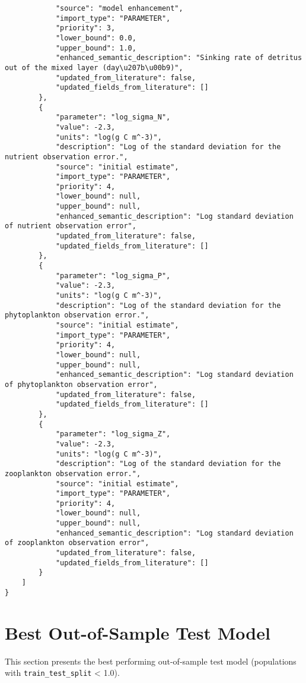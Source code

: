 \begin{lstlisting}
            "source": "model enhancement",
            "import_type": "PARAMETER",
            "priority": 3,
            "lower_bound": 0.0,
            "upper_bound": 1.0,
            "enhanced_semantic_description": "Sinking rate of detritus out of the mixed layer (day\u207b\u00b9)",
            "updated_from_literature": false,
            "updated_fields_from_literature": []
        },
        {
            "parameter": "log_sigma_N",
            "value": -2.3,
            "units": "log(g C m^-3)",
            "description": "Log of the standard deviation for the nutrient observation error.",
            "source": "initial estimate",
            "import_type": "PARAMETER",
            "priority": 4,
            "lower_bound": null,
            "upper_bound": null,
            "enhanced_semantic_description": "Log standard deviation of nutrient observation error",
            "updated_from_literature": false,
            "updated_fields_from_literature": []
        },
        {
            "parameter": "log_sigma_P",
            "value": -2.3,
            "units": "log(g C m^-3)",
            "description": "Log of the standard deviation for the phytoplankton observation error.",
            "source": "initial estimate",
            "import_type": "PARAMETER",
            "priority": 4,
            "lower_bound": null,
            "upper_bound": null,
            "enhanced_semantic_description": "Log standard deviation of phytoplankton observation error",
            "updated_from_literature": false,
            "updated_fields_from_literature": []
        },
        {
            "parameter": "log_sigma_Z",
            "value": -2.3,
            "units": "log(g C m^-3)",
            "description": "Log of the standard deviation for the zooplankton observation error.",
            "source": "initial estimate",
            "import_type": "PARAMETER",
            "priority": 4,
            "lower_bound": null,
            "upper_bound": null,
            "enhanced_semantic_description": "Log standard deviation of zooplankton observation error",
            "updated_from_literature": false,
            "updated_fields_from_literature": []
        }
    ]
}
\end{lstlisting}
\clearpage
\section{Best Out-of-Sample Test Model}
\label{sec:best_out_of_sample}
This section presents the best performing out-of-sample test model (populations with \texttt{train\_test\_split} < 1.0).

